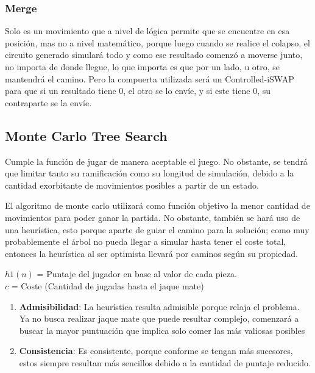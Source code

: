 \subsubsection{Merge}

Solo es un movimiento que a nivel de lógica permite que se encuentre en esa posición, mas no a nivel matemático, porque luego cuando se realice el colapso, el circuito generado simulará todo y como ese resultado comenzó a moverse junto, no importa de donde llegue, lo que importa es que por un lado, u otro, se mantendrá el camino. Pero la compuerta utilizada será un Controlled-iSWAP para que si un resultado tiene 0, el otro se lo envíe, y si este tiene 0, su contraparte se la envíe.

\subsection{Monte Carlo Tree Search}

Cumple la función de jugar de manera aceptable el juego. No obstante, se tendrá que limitar tanto su ramificación como su longitud de simulación, debido a la cantidad exorbitante de movimientos posibles a partir de un estado.



El algoritmo de monte carlo utilizará como función objetivo la menor cantidad de movimientos para poder ganar la partida. No obstante, también se hará uso de una heurística, esto porque aparte de guiar el camino para la solución; como muy probablemente el árbol no pueda llegar a simular hasta tener el coste total, entonces la heurística al ser optimista llevará por caminos según su propiedad. 

\(h1(n)\) = Puntaje del jugador en base al valor de cada pieza.\\

\(c\) = Coste (Cantidad de jugadas hasta el jaque mate)

\begin{enumerate}
	\item \textbf{Admisibilidad}: La heurística resulta admisible porque relaja el problema. Ya no busca realizar jaque mate que puede resultar complejo, comenzará a buscar la mayor puntuación que implica solo comer las más valiosas posibles
	\item \textbf{Consistencia}: Es consistente, porque conforme se tengan más sucesores, estos siempre resultan más sencillos debido a la cantidad de puntaje reducido.
\end{enumerate}

